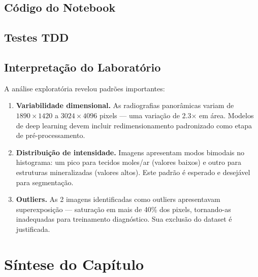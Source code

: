 \subsection{Código do Notebook}


\subsection{Testes TDD}



\subsection{Interpretação do Laboratório}

A análise exploratória revelou padrões importantes:
\begin{enumerate}
    \item \textbf{Variabilidade dimensional.} As radiografias panorâmicas variam de $1890 \times 1420$ a $3024 \times 4096$ pixels — uma variação de 2.3$\times$ em área. Modelos de deep learning devem incluir redimensionamento padronizado como etapa de pré-processamento.
    \item \textbf{Distribuição de intensidade.} Imagens apresentam modos bimodais no histograma: um pico para tecidos moles/ar (valores baixos) e outro para estruturas mineralizadas (valores altos). Este padrão é esperado e desejável para segmentação.
    \item \textbf{Outliers.} As 2 imagens identificadas como outliers apresentavam superexposição — saturação em mais de 40\% dos pixels, tornando-as inadequadas para treinamento diagnóstico. Sua exclusão do dataset é justificada.
\end{enumerate}

\section{Síntese do Capítulo}

